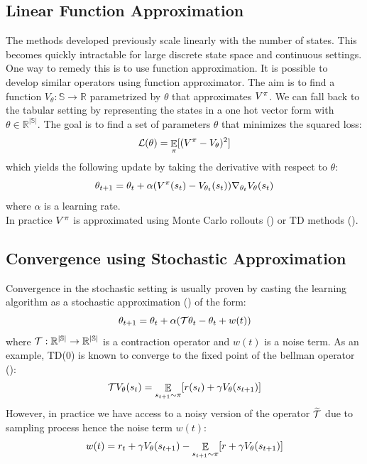 \subsection{Linear Function Approximation}
The methods developed previously scale linearly with the number of states. This becomes quickly intractable for large discrete state space and continuous settings. One way to remedy this is to use function approximation. It is possible to develop similar operators using function approximator.
The aim is to find a function $V_\theta: \mathbb{S} \rightarrow \mathbb{R}$ parametrized by $\theta$ that approximates $V^{\pi}$. We can fall back to the tabular setting by representing the states in a one hot vector form with $\theta \in \mathbb{R^{|\mathbb{S}|}}$. The goal is to find a set of parameters $\theta$ that minimizes the squared loss:
\begin{equation}\label{simple_loss}
    \mathcal{L}(\theta) = \mathop{\mathbb{E}}_{\pi} [(V^{\pi} - V_\theta)^2]
\end{equation}
which yields the following update by taking the derivative with respect to $\theta$:
\begin{equation}
    \theta_{t+1} = \theta_t + \alpha (V^{\pi}(s_t) - V_{\theta_t}(s_t)) \nabla_{\theta_t} V_{\theta}(s_t)
\end{equation}
where $\alpha$ is a learning rate.\\
In practice $V^{\pi}$ is approximated using Monte Carlo rollouts (\cite{suttonreinforcement}) or TD methods (\cite{sutton1988learning}).

\subsection{Convergence using Stochastic Approximation}
Convergence in the stochastic setting is usually proven by casting the learning algorithm as a stochastic approximation (\cite{tsitsiklis1994asynchronous,borkar2009stochastic,borkar2000ode}) of the form:
\begin{equation}\label{stoch}
    \theta_{t+1} = \theta_t + \alpha( \mathcal{T} \theta_t  - \theta_t + w(t)) 
\end{equation}
where $\mathcal{T}: \mathbb{R^{|\mathbb{S}|}} \rightarrow \mathbb{R^{|\mathbb{S}|}}$ is a contraction operator and $w(t)$ is a noise term. 
As an example, TD(0) is known to converge to the fixed point of the bellman operator (\cite{sutton1988learning}):
\begin{equation}
\begin{split}
    \mathcal{T} V_{\theta}(s_t) &= \mathop{\mathbb{E}}_{s_{t+1} \sim \pi} [r(s_t) + \gamma V_{\theta}(s_{t+1})]\\
\end{split}
\end{equation}
However, in practice we have access to a noisy version of the operator $\widetilde{\mathcal{T}}$ due to sampling process hence the noise term $w(t)$:
\begin{equation}
    w(t) = r_t + \gamma V_{\theta} (s_{t+1}) - \mathop{\mathbb{E}}_{s_{t+1} \sim \pi} [r + \gamma V_{\theta}(s_{t+1})]
\end{equation}

